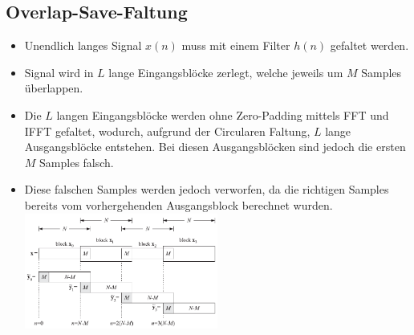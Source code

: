 	\subsection{Overlap-Save-Faltung}
		\begin{itemize}
			 \item Unendlich langes Signal $x(n)$ muss mit einem Filter $h(n)$ gefaltet werden.
			 \item Signal wird in $L$ lange Eingangsblöcke zerlegt, welche jeweils um $M$ Samples überlappen.
			 \item Die $L$ langen Eingangsblöcke werden ohne Zero-Padding mittels FFT und IFFT gefaltet, wodurch, aufgrund der Circularen Faltung, $L$ lange Ausgangsblöcke entstehen. Bei diesen Ausgangsblöcken sind jedoch die ersten $M$ Samples falsch.
			 \item Diese falschen Samples werden jedoch verworfen, da die richtigen Samples bereits vom vorhergehenden Ausgangsblock berechnet wurden.\\[0.3cm]
			 \includegraphics[width = 0.5\textwidth]{pic/overlapSave.pdf}
		\end{itemize}